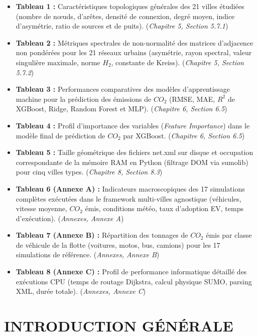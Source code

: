 \documentclass[10pt, a4paper]{article}
\providecommand{\tightlist}{}
\begin{document}
\begin{itemize}
\tightlist
\item
  \textbf{Tableau 1 :} Caractéristiques topologiques générales des 21
  villes étudiées (nombre de nœuds, d'arêtes, densité de connexion,
  degré moyen, indice d'asymétrie, ratio de sources et de puits).
  (\emph{Chapitre 5, Section 5.7.1})
\item
  \textbf{Tableau 2 :} Métriques spectrales de non-normalité des
  matrices d'adjacence non pondérées pour les 21 réseaux urbains
  (asymétrie, rayon spectral, valeur singulière maximale, norme \(H_2\),
  constante de Kreiss). (\emph{Chapitre 5, Section 5.7.2})
\item
  \textbf{Tableau 3 :} Performances comparatives des modèles
  d'apprentissage machine pour la prédiction des émissions de \(CO_2\)
  (RMSE, MAE, \(R^2\) de XGBoost, Ridge, Random Forest et MLP).
  (\emph{Chapitre 6, Section 6.5})
\item
  \textbf{Tableau 4 :} Profil d'importance des variables (\emph{Feature
  Importance}) dans le modèle final de prédiction de \(CO_2\) par
  XGBoost. (\emph{Chapitre 6, Section 6.5})
\item
  \textbf{Tableau 5 :} Taille géométrique des fichiers net.xml sur
  disque et occupation correspondante de la mémoire RAM en Python
  (filtrage DOM via sumolib) pour cinq villes types. (\emph{Chapitre 8,
  Section 8.3})
\item
  \textbf{Tableau 6 (Annexe A) :} Indicateurs macroscopiques des 17
  simulations complètes exécutées dans le framework multi-villes
  agnostique (véhicules, vitesse moyenne, \(CO_2\) émis, conditions
  météo, taux d'adoption EV, temps d'exécution). (\emph{Annexes, Annexe
  A})
\item
  \textbf{Tableau 7 (Annexe B) :} Répartition des tonnages de \(CO_2\)
  émis par classe de véhicule de la flotte (voitures, motos, bus,
  camions) pour les 17 simulations de référence. (\emph{Annexes, Annexe
  B})
\item
  \textbf{Tableau 8 (Annexe C) :} Profil de performance informatique
  détaillé des exécutions CPU (temps de routage Dijkstra, calcul
  physique SUMO, parsing XML, durée totale). (\emph{Annexes, Annexe C})
\end{itemize}

\newpage

\section{INTRODUCTION GÉNÉRALE}\label{introduction-guxe9nuxe9rale}
\end{document}
